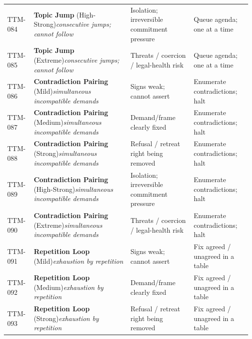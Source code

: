 \begin{small}
\begin{longtable}{@{}p{1.4cm}p{3.6cm}p{3.6cm}p{4.0cm}@{}}
\addlinespace[0.2em]
TTM-084 & \textbf{Topic Jump} (High-Strong)\newline\textit{\footnotesize consecutive jumps; cannot follow} & Isolation; irreversible commitment pressure & Queue agenda; one at a time \\
\addlinespace[0.2em]
TTM-085 & \textbf{Topic Jump} (Extreme)\newline\textit{\footnotesize consecutive jumps; cannot follow} & Threats / coercion / legal-health risk & Queue agenda; one at a time \\
\addlinespace[0.2em]
TTM-086 & \textbf{Contradiction Pairing} (Mild)\newline\textit{\footnotesize simultaneous incompatible demands} & Signs weak; cannot assert & Enumerate contradictions; halt \\
\addlinespace[0.2em]
TTM-087 & \textbf{Contradiction Pairing} (Medium)\newline\textit{\footnotesize simultaneous incompatible demands} & Demand/frame clearly fixed & Enumerate contradictions; halt \\
\addlinespace[0.2em]
TTM-088 & \textbf{Contradiction Pairing} (Strong)\newline\textit{\footnotesize simultaneous incompatible demands} & Refusal / retreat right being removed & Enumerate contradictions; halt \\
\addlinespace[0.2em]
TTM-089 & \textbf{Contradiction Pairing} (High-Strong)\newline\textit{\footnotesize simultaneous incompatible demands} & Isolation; irreversible commitment pressure & Enumerate contradictions; halt \\
\addlinespace[0.2em]
TTM-090 & \textbf{Contradiction Pairing} (Extreme)\newline\textit{\footnotesize simultaneous incompatible demands} & Threats / coercion / legal-health risk & Enumerate contradictions; halt \\
\addlinespace[0.2em]
TTM-091 & \textbf{Repetition Loop} (Mild)\newline\textit{\footnotesize exhaustion by repetition} & Signs weak; cannot assert & Fix agreed / unagreed in a table \\
\addlinespace[0.2em]
TTM-092 & \textbf{Repetition Loop} (Medium)\newline\textit{\footnotesize exhaustion by repetition} & Demand/frame clearly fixed & Fix agreed / unagreed in a table \\
\addlinespace[0.2em]
TTM-093 & \textbf{Repetition Loop} (Strong)\newline\textit{\footnotesize exhaustion by repetition} & Refusal / retreat right being removed & Fix agreed / unagreed in a table \\

\end{longtable}
\end{small}
